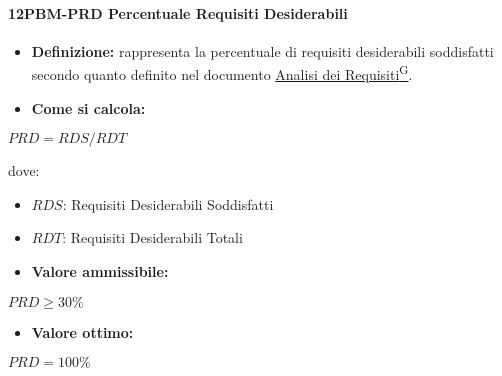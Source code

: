 \paragraph*{12PBM-PRD Percentuale Requisiti Desiderabili}
\begin{itemize}
    \item \textbf{Definizione:} rappresenta la percentuale di requisiti desiderabili soddisfatti secondo quanto definito nel documento \href{https://code7crusaders.github.io/docs/PB/documentazione_interna/glossario.html#analisi-dei-requisiti}{Analisi dei Requisiti\textsuperscript{G}}.
    \item \textbf{Come si calcola:}
\end{itemize}
\begin{center}
   $PRD = RDS/RDT$ 
\end{center}
dove:
\begin{itemize}[label=$\rightarrow$]
    \item $RDS$: Requisiti Desiderabili Soddisfatti
    \item $RDT$: Requisiti Desiderabili Totali
\end{itemize}
\begin{itemize}
    \item \textbf{Valore ammissibile:}
\end{itemize}
\begin{center}
    $PRD \geq 30\%$
\end{center}
\begin{itemize}
    \item \textbf{Valore ottimo:}
\end{itemize}
\begin{center}
    $PRD = 100\%$
\end{center}

